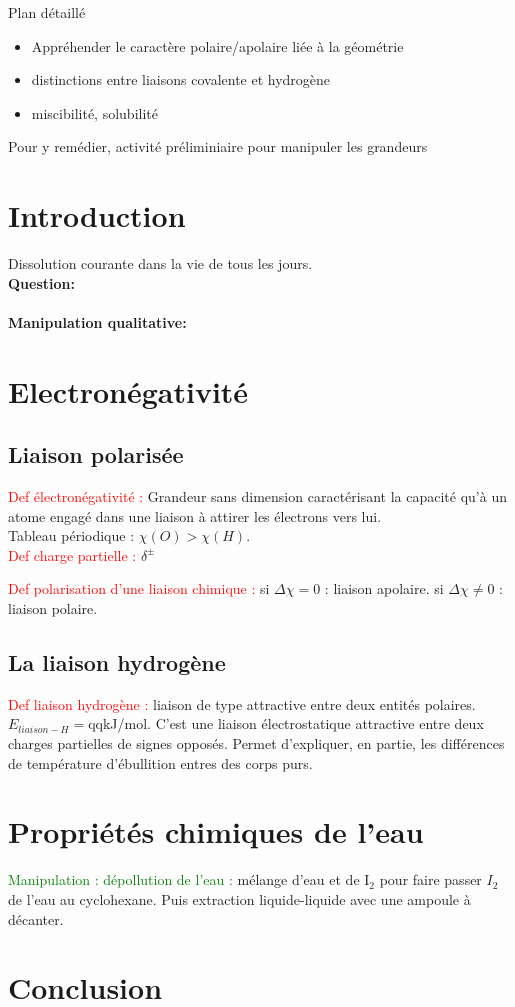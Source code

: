 \begin{reportBlock}{Plan détaillé}
\begin{itemize}
\item Appréhender le caractère polaire/apolaire liée à la géométrie
\item distinctions entre liaisons covalente et hydrogène
\item miscibilité, solubilité
\end{itemize}
Pour y remédier, activité préliminiaire pour manipuler les grandeurs
\section*{Introduction }
Dissolution courante dans la vie de tous les jours.\\
\textbf{Question:}

\paragraph*{Manipulation qualitative:} \textcolor{green}{}

\section{Electronégativité}

\subsection{Liaison polarisée}

\textcolor{red}{Def électronégativité : }Grandeur sans dimension caractérisant la capacité qu'à un atome engagé dans une liaison à attirer les électrons vers lui.\\
Tableau périodique : $\chi(O)>\chi(H)$.\\

\textcolor{red}{Def charge partielle : }$\delta^{\pm}$

\textcolor{red}{Def polarisation d'une liaison chimique : }si $\Delta\chi=0$ : liaison apolaire. si $\Delta\chi\neq 0$ : liaison polaire.

\subsection{La liaison hydrogène}
\textcolor{red}{Def liaison hydrogène : }liaison de type attractive entre deux entités polaires. $E_{liaison-H}=$qqkJ/mol. C'est une liaison électrostatique attractive entre deux charges partielles de signes opposés. Permet d'expliquer, en partie, les différences de température d'ébullition entres des corps purs.


\section{Propriétés chimiques de l'eau}

\textcolor{green}{Manipulation : dépollution de l'eau :} mélange d'eau et de I$_2$ pour faire passer $I_2$ de l'eau au cyclohexane. Puis extraction liquide-liquide avec une ampoule à décanter.

\section*{Conclusion} 
\end{reportBlock}